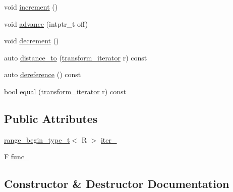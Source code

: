 \begin{DoxyCompactItemize}
\item 
void \mbox{\hyperlink{structrah_1_1view_1_1transform__iterator_a1ee5c30f733b63b1cd26baa121389dd1}{increment}} ()
\item 
void \mbox{\hyperlink{structrah_1_1view_1_1transform__iterator_a56c602664659b11bfca3da418c6977be}{advance}} (intptr\+\_\+t off)
\item 
void \mbox{\hyperlink{structrah_1_1view_1_1transform__iterator_a05c99213d071102e793d57b967f7880d}{decrement}} ()
\item 
auto \mbox{\hyperlink{structrah_1_1view_1_1transform__iterator_ae0919c95985ebca42017346da790c981}{distance\+\_\+to}} (\mbox{\hyperlink{structrah_1_1view_1_1transform__iterator}{transform\+\_\+iterator}} r) const
\item 
auto \mbox{\hyperlink{structrah_1_1view_1_1transform__iterator_af72f5246736a89feca39293123a999e2}{dereference}} () const
\item 
bool \mbox{\hyperlink{structrah_1_1view_1_1transform__iterator_a68105373ae5ce99863589e17605f3833}{equal}} (\mbox{\hyperlink{structrah_1_1view_1_1transform__iterator}{transform\+\_\+iterator}} r) const
\end{DoxyCompactItemize}
\subsection*{Public Attributes}
\begin{DoxyCompactItemize}
\item 
\mbox{\hyperlink{namespacerah_a28aff4eeddcece6be65ff0b956d32d4a}{range\+\_\+begin\+\_\+type\+\_\+t}}$<$ R $>$ \mbox{\hyperlink{structrah_1_1view_1_1transform__iterator_a349798fe3a741068fd28e50387f39e80}{iter\+\_\+}}
\item 
F \mbox{\hyperlink{structrah_1_1view_1_1transform__iterator_a02ac2e8035d0b7917ee44967069def0d}{func\+\_\+}}
\end{DoxyCompactItemize}


\subsection{Constructor \& Destructor Documentation}
\mbox{\label{structrah_1_1view_1_1transform__iterator_ae8f127be961b14896c87d94e710a9a1a}} 
